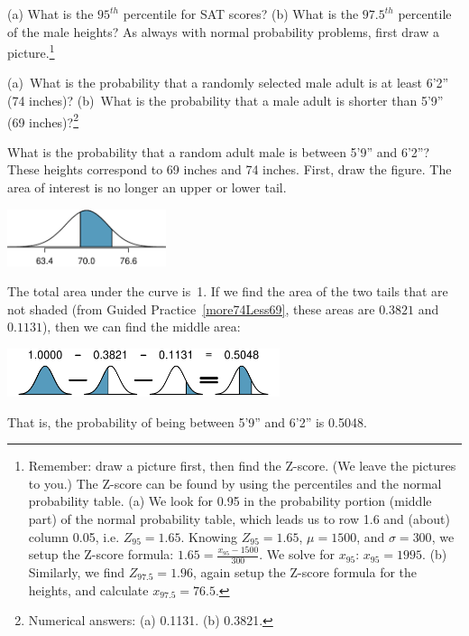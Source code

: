 \begin{exercise}
(a) What is the $95^{th}$ percentile for SAT scores? (b) What is the $97.5^{th}$ percentile of the male heights? As always with normal probability problems, first draw a picture.\footnote{Remember: draw a picture first, then find the Z-score. (We leave the pictures to you.) The Z-score can be found by using the percentiles and the normal probability table. (a) We look for 0.95 in the probability portion (middle part) of the normal probability table, which leads us to row 1.6 and (about) column 0.05, i.e. $Z_{95}=1.65$. Knowing $Z_{95}=1.65$, $\mu = 1500$, and $\sigma = 300$, we setup the Z-score formula: $1.65 = \frac{x_{95} - 1500}{300}$. We solve for $x_{95}$: $x_{95} = 1995$. (b) Similarly, we find $Z_{97.5} = 1.96$, again setup the Z-score formula for the heights, and calculate $x_{97.5} = 76.5$.}
\end{exercise}

\begin{exercise}\label{more74Less69}
(a)~What is the probability that a randomly selected male adult is at least 6'2'' (74 inches)? (b)~What is the probability that a male adult is shorter than 5'9'' (69 inches)?\footnote{Numerical answers: (a) 0.1131. (b) 0.3821.}
\end{exercise}

\begin{example}{What is the probability that a random adult male is between 5'9'' and 6'2''?}
These heights correspond to 69 inches and 74 inches. First, draw the figure. The area of interest is no longer an upper or lower tail.\textC{\vspace{-2mm}}
\begin{center}
\includegraphics[width=0.35\textwidth]{ch_distributions/figures/between59And62/between59And62}\textC{\vspace{-2mm}}
\end{center}
The total area under the curve is~1. If we find the area of the two tails that are not shaded (from Guided Practice~\ref{more74Less69}, these areas are $0.3821$ and $0.1131$), then we can find the middle area:\textC{\vspace{-2mm}}
\begin{center}
\includegraphics[width=0.6\textwidth]{ch_distributions/figures/subtracting2Areas/subtracting2Areas}\textC{\vspace{-2mm}}
\end{center}
That is, the probability of being between 5'9'' and 6'2'' is 0.5048.
\end{example}

